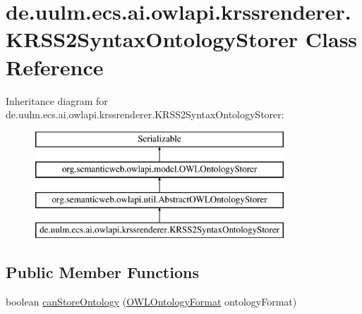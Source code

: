 \hypertarget{classde_1_1uulm_1_1ecs_1_1ai_1_1owlapi_1_1krssrenderer_1_1_k_r_s_s2_syntax_ontology_storer}{\section{de.\-uulm.\-ecs.\-ai.\-owlapi.\-krssrenderer.\-K\-R\-S\-S2\-Syntax\-Ontology\-Storer Class Reference}
\label{classde_1_1uulm_1_1ecs_1_1ai_1_1owlapi_1_1krssrenderer_1_1_k_r_s_s2_syntax_ontology_storer}
}
Inheritance diagram for de.\-uulm.\-ecs.\-ai.\-owlapi.\-krssrenderer.\-K\-R\-S\-S2\-Syntax\-Ontology\-Storer\-:\begin{figure}[H]
\begin{center}
\leavevmode
\includegraphics[height=4.000000cm]{classde_1_1uulm_1_1ecs_1_1ai_1_1owlapi_1_1krssrenderer_1_1_k_r_s_s2_syntax_ontology_storer}
\end{center}
\end{figure}
\subsection*{Public Member Functions}
\begin{DoxyCompactItemize}
\item 
boolean \hyperlink{classde_1_1uulm_1_1ecs_1_1ai_1_1owlapi_1_1krssrenderer_1_1_k_r_s_s2_syntax_ontology_storer_ac3ea5bdf753430a2f440a88ab544d11a}{can\-Store\-Ontology} (\hyperlink{classorg_1_1semanticweb_1_1owlapi_1_1model_1_1_o_w_l_ontology_format}{O\-W\-L\-Ontology\-Format} ontology\-Format)
\end{DoxyCompactItemize}
